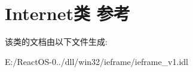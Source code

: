 \hypertarget{class_internet}{}\section{Internet类 参考}
\label{class_internet}


该类的文档由以下文件生成\+:\begin{DoxyCompactItemize}
\item 
E\+:/\+React\+O\+S-\/0../dll/win32/ieframe/ieframe\+\_\+v1.\+idl\end{DoxyCompactItemize}
